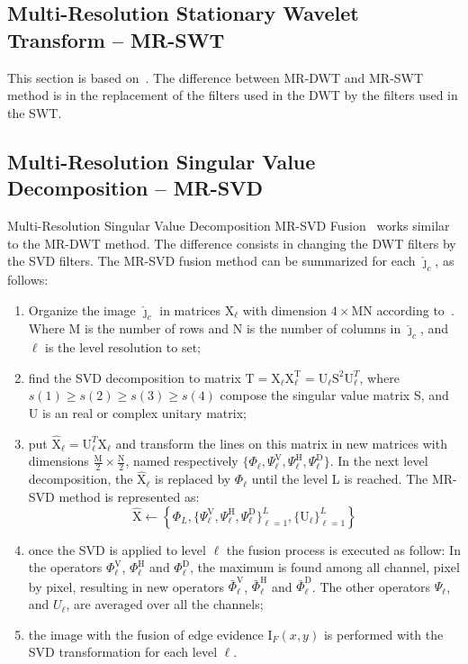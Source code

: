\documentclass[journal]{IEEEtran}
\begin{document}
\subsection{Multi-Resolution Stationary Wavelet Transform -- MR-SWT}  
This section is based on~\cite{n_r, jjly}. The difference between MR-DWT and MR-SWT method is in the replacement of the filters used in the DWT by the filters used in the SWT.

\subsection{Multi-Resolution Singular Value Decomposition -- MR-SVD}

Multi-Resolution Singular Value Decomposition MR-SVD Fusion~\cite{naidu} works similar to the MR-DWT method. The difference consists in changing the DWT filters by the SVD filters. The MR-SVD fusion method can be summarized for each $\widehat\jmath_c$, as follows:
\begin{enumerate}
\item Organize the image $\widehat\jmath_c$ in matrices $\text{X}_\ell$ with dimension $4\times\text{MN}$ according to~\cite{naidu}. Where M is the number of rows and N is the number of columns in $\widehat\jmath_c$, and $\ell$ is the level resolution to set;  
\item find the SVD decomposition to matrix $\text{T}=\text{X}_\ell \text{X}_\ell^\text{T}=\text{U}_\ell \text{S}^2 \text{U}_\ell^T$, where $s(1)\geq s(2) \geq s(3) \geq s(4)$ compose the singular value matrix S, and U is an real or complex unitary matrix;
\item put $\widehat{\text{X}}_\ell=\text{U}_\ell^T\text{X}_\ell$ and transform the lines on this matrix in new matrices with dimensions $\frac{\text{M}}{2}\times\frac{\text{N}}{2}$, named respectively $\{\Phi_\ell, \Psi_\ell^\text{V}, \Psi_\ell^\text{H}, \Psi_\ell^\text{D}\}$. In the next level decomposition, the $\widehat{\text{X}}_\ell$ is replaced by $\Phi_\ell$ until the level L is reached. The MR-SVD method is represented as:
\begin{equation}\label{msvd_iter}
\widehat{\text{X}}\leftarrow \left\{\Phi_L,\{\Psi_\ell^\text{V},\Psi_\ell^\text{H},\Psi_\ell^\text{D} \}_{\ell=1}^L,\{\text{U}_\ell\}_{\ell=1}^L \right\}
\end{equation}
\item once the SVD is applied to level $\ell$ the fusion process is executed as follow: In the operators $\Phi_\ell^\text{V}$, $\Phi_\ell^\text{H}$ and $\Phi_\ell^\text{D}$, the maximum is found among all channel, pixel by pixel, resulting in new operators $\bar{\Phi}_\ell^\text{V}$, $\bar{\Phi}_\ell^\text{H}$ and $\bar{\Phi}_\ell^\text{D}$. The other operators $\Psi_\ell$, and $U_\ell$, are averaged over all the channels;
\item the image with the fusion of edge evidence $\text{I}_F(x,y)$ is performed with the SVD transformation for each level $\ell$. 
\end{enumerate}
\end{document}

